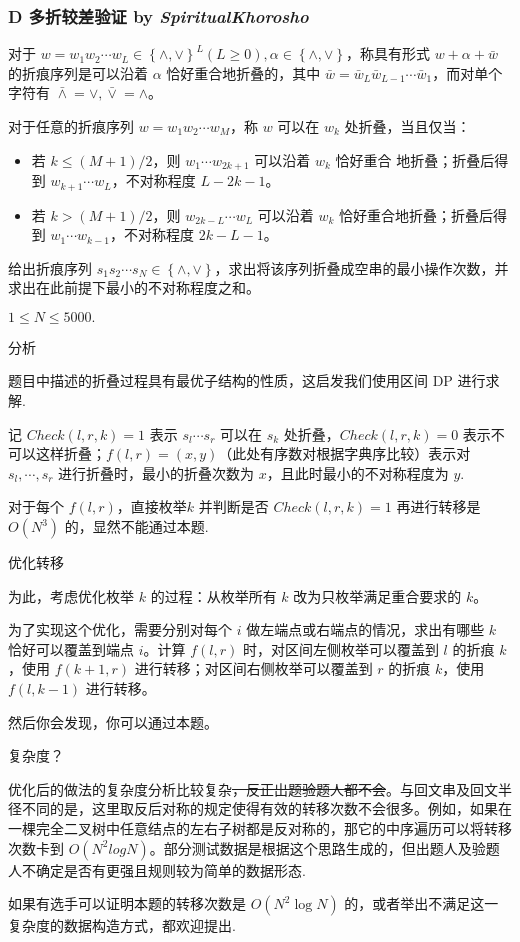 \frame
{
  \frametitle{D 多折较差验证 {by \itshape SpiritualKhorosho}}

  	对于 $w=w_1 w_2 \cdots w_L \in \left\{\land, \lor\right\}^L (L\ge 0), \alpha \in \left\{\land, \lor\right\}$，称具有形式 $w + \alpha + \bar{w}$ 的折痕序列是可以沿着 $\alpha$ 恰好重合地折叠的，其中
	$\bar{w} = \bar{w}_L \bar{w}_{L-1} \cdots \bar{w}_1$，而对单个字符有 $\bar{\land} = \lor, \bar{\lor} = \land$。

	对于任意的折痕序列 $w = w_1 w_2 \cdots w_M$，称 $w$ 可以在 $w_k$ 处折叠，当且仅当：
	\begin{itemize}
		\item 若 $k\le (M+1)/2$，则 $w_1 \cdots w_{2k+1}$ 可以沿着 $w_k$ 恰好重合 地折叠；折叠后得到 $w_{k+1} \cdots w_L$，不对称程度 $L - 2k - 1$。
		\item 若 $k> (M+1)/2$，则 $w_{2k-L} \cdots w_L$ 可以沿着 $w_k$ 恰好重合地折叠；折叠后得到 $w_1 \cdots w_{k-1}$，不对称程度 $2k-L-1$。
	\end{itemize}

	给出折痕序列 $s_1 s_2 \cdots s_N \in \left\{\land, \lor\right\}$，求出将该序列折叠成空串的最小操作次数，并求出在此前提下最小的不对称程度之和。

	$1\le N\le 5000.$
}

\begin{frame}{分析}
	
	题目中描述的折叠过程具有最优子结构的性质，这启发我们使用区间 DP 进行求解.

	记 $Check(l, r, k) = 1$ 表示 $s_l \cdots s_r$ 可以在 $s_k$ 处折叠，$Check(l, r, k) = 0$ 表示不可以这样折叠；$f(l,r) =(x,y)$（此处有序数对根据字典序比较）表示对 $s_l, \cdots, s_r$ 进行折叠时，最小的折叠次数为 $x$，且此时最小的不对称程度为 $y$.

	对于每个 $f(l,r)$，直接枚举$k$ 并判断是否 $Check(l,r,k)=1$ 再进行转移是 $O\left(N^3\right)$ 的，显然不能通过本题.

\end{frame}

\begin{frame}{优化转移}
	
	为此，考虑优化枚举 $k$ 的过程：从枚举所有 $k$ 改为只枚举满足重合要求的 $k$。

	为了实现这个优化，需要分别对每个 $i$ 做左端点或右端点的情况，求出有哪些 $k$ 恰好可以覆盖到端点 $i$。计算 $f(l,r)$ 时，对区间左侧枚举可以覆盖到 $l$ 的折痕 $k$，使用 $f(k+1,r)$ 进行转移；对区间右侧枚举可以覆盖到 $r$ 的折痕 $k$，使用 $f(l,k-1)$ 进行转移。\pause

	然后你会发现，你可以通过本题。

\end{frame}


\begin{frame}{复杂度？}
	
	优化后的做法的复杂度分析比较复杂\sout{，反正出题验题人都不会}。与回文串及回文半径不同的是，这里取反后对称的规定使得有效的转移次数不会很多。例如，如果在一棵完全二叉树中任意结点的左右子树都是反对称的，那它的中序遍历可以将转移次数卡到 $O\left(N^2 log N\right)$。部分测试数据是根据这个思路生成的，但出题人及验题人不确定是否有更强且规则较为简单的数据形态.

	如果有选手可以证明本题的转移次数是 $O(N^2 \log N)$ 的，或者举出不满足这一复杂度的数据构造方式，都欢迎提出.

\end{frame}